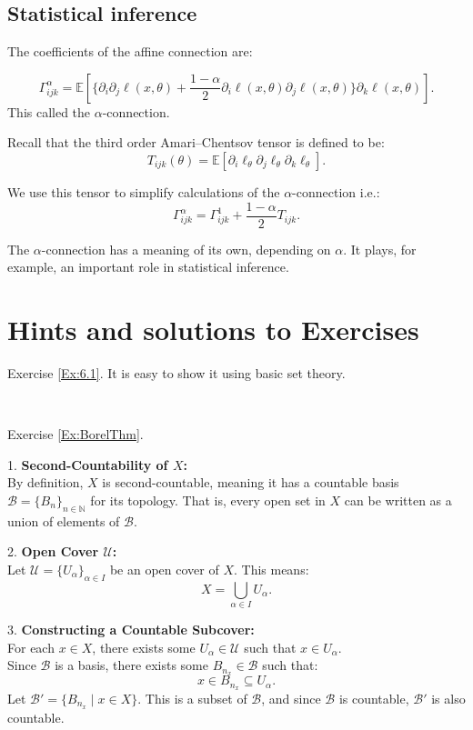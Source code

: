 {\subsection{Statistical inference}
The coefficients of the affine connection are:

\[\Gamma_{ijk}^\alpha=\mathbb{E}[\{\partial_i\partial_j\ell(x,\theta)+\frac{1-\alpha}{2}\partial_i\ell(x,\theta)\partial_j\ell(x,\theta)\}\partial_k\ell(x,\theta)].\] 
This called the $\alpha$-connection. 

Recall that the third order Amari--Chentsov tensor is defined to be: 
\[T_{ijk}(\theta)=\mathbb{E}[\partial_i\ell_\theta\partial_j\ell_\theta\partial_k\ell_\theta].\]

We use this tensor to simplify calculations of the $\alpha$-connection i.e.: 
$$\Gamma_{ijk}^\alpha=\Gamma_{ijk}^1+\frac{1-\alpha}{2}T_{ijk}.$$

 The $\alpha$-connection has a meaning of its own, depending on $\alpha$.  It plays, for example, an important role in statistical inference. 


\section{Hints and solutions to Exercises}

Exercise \ref{Ex:6.1}. It is easy to show it using basic set theory.

\, 
 
Exercise \ref{Ex:BorelThm}.
~

1. \textbf{Second-Countability of $ X $:} \\
   By definition, $ X $ is second-countable, meaning it has a countable basis $ \mathcal{B} = \{B_n\}_{n \in \mathbb{N}} $ for its topology. That is, every open set in $ X $ can be written as a union of elements of $ \mathcal{B} $.

2. \textbf{Open Cover $ \mathcal{U} $:} \\
   Let $ \mathcal{U} = \{U_\alpha\}_{\alpha \in I} $ be an open cover of $ X $. This means:
   \[
   X = \bigcup_{\alpha \in I} U_\alpha.
   \]

3. \textbf{Constructing a Countable Subcover:} \\
   For each $ x \in X $, there exists some $ U_\alpha \in \mathcal{U} $ such that $ x \in U_\alpha $. \\
   Since $ \mathcal{B} $ is a basis, there exists some $ B_{n_x} \in \mathcal{B} $ such that:
   \[
   x \in B_{n_x} \subseteq U_\alpha.
   \]
   Let $ \mathcal{B}' = \{B_{n_x} \mid x \in X\} $. This is a subset of $ \mathcal{B} $, and since $ \mathcal{B} $ is countable, $ \mathcal{B}' $ is also countable.

}

